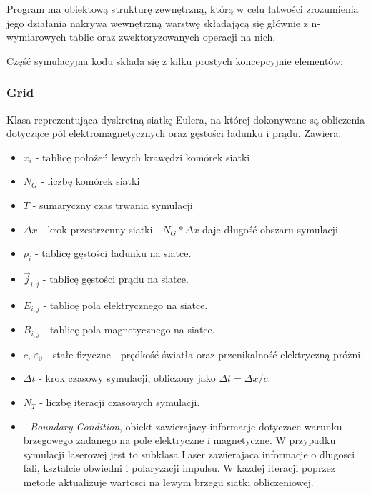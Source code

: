 {    Program ma obiektową strukturę zewnętrzną, którą w celu łatwości
    zrozumienia jego działania nakrywa wewnętrzną warstwę składającą się
    głównie z n-wymiarowych tablic  oraz zwektoryzowanych
    operacji na nich.

    Część symulacyjna kodu składa się z kilku prostych koncepcyjnie elementów:

    \subsubsection{Grid}
    Klasa reprezentująca dyskretną siatkę Eulera, na której dokonywane są
    obliczenia dotyczące pól elektromagnetycznych oraz gęstości ładunku i
    prądu.  Zawiera:
    \begin{itemize}
        \item $x_i$ - tablicę położeń lewych krawędzi komórek siatki
        \item $N_G$ - liczbę komórek siatki
        \item $T$ - sumaryczny czas trwania symulacji
        \item $\Delta x$ - krok przestrzenny siatki - $N_G * \Delta x$ daje
            długość obszaru symulacji
        \item $\rho_i$ - tablicę gęstości ładunku na siatce.
        \item $\vec{j}_{i,j}$ - tablicę gęstości prądu na siatce.
        \item $E_{i,j}$ - tablicę pola elektrycznego na siatce.
        \item $B_{i,j}$ - tablicę pola magnetycznego na siatce.
        \item $c$, $\varepsilon_0$ - stałe fizyczne - prędkość światła oraz
            przenikalność elektryczną próżni.
        \item $\Delta t$ - krok czasowy symulacji, obliczony jako $\Delta t =
            \Delta x / c$.
        \item $N_T$ - liczbę iteracji czasowych symulacji.
        \item {} - \emph{Boundary Condition}, obiekt zawierajacy informacje dotyczace
            warunku brzegowego zadanego na pole elektryczne i magnetyczne. W przypadku symulacji
            laserowej jest to subklasa Laser zawierajaca informacje o dlugosci fali, ksztalcie obwiedni
            i polaryzacji impulsu. W kazdej iteracji  poprzez metode
             aktualizuje wartosci na lewym brzegu siatki obliczeniowej.            
    \end{itemize}

}
